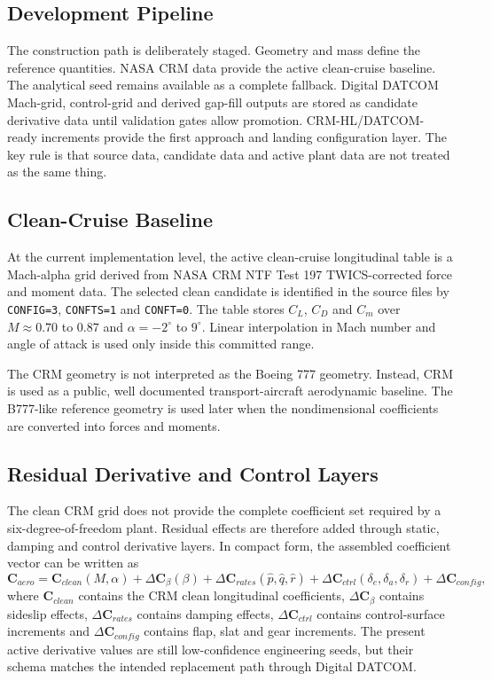 \subsection{Development Pipeline}

The construction path is deliberately staged. Geometry and mass define the
reference quantities. NASA CRM data provide the active clean-cruise baseline.
The analytical seed remains available as a complete fallback. Digital DATCOM
Mach-grid, control-grid and derived gap-fill outputs are stored as candidate
derivative data until validation gates allow promotion. CRM-HL/DATCOM-ready
increments provide the first approach and landing configuration layer. The key
rule is that source data, candidate data and active plant data are not treated
as the same thing.

\subsection{Clean-Cruise Baseline}

At the current implementation level, the active clean-cruise longitudinal table
is a Mach-alpha grid derived from NASA CRM NTF Test 197 TWICS-corrected force
and moment data. The selected clean candidate is identified in the source files
by \texttt{CONFIG=3}, \texttt{CONFTS=1} and \texttt{CONFT=0}. The table stores
$C_L$, $C_D$ and $C_m$ over $M \approx 0.70$ to $0.87$ and
$\alpha=-2^\circ$ to $9^\circ$. Linear interpolation in Mach number and angle
of attack is used only inside this committed range.

The CRM geometry is not interpreted as the Boeing 777 geometry. Instead, CRM is
used as a public, well documented transport-aircraft aerodynamic baseline. The
B777-like reference geometry is used later when the nondimensional
coefficients are converted into forces and moments.

\subsection{Residual Derivative and Control Layers}

The clean CRM grid does not provide the complete coefficient set required by a
six-degree-of-freedom plant. Residual effects are therefore added through
static, damping and control derivative layers. In compact form, the assembled
coefficient vector can be written as
\begin{equation}
    \bm{C}_{aero} =
    \bm{C}_{clean}(M,\alpha)
    + \Delta\bm{C}_{\beta}(\beta)
    + \Delta\bm{C}_{rates}(\hat{p},\hat{q},\hat{r})
    + \Delta\bm{C}_{ctrl}(\delta_e,\delta_a,\delta_r)
    + \Delta\bm{C}_{config},
\end{equation}
where $\bm{C}_{clean}$ contains the CRM clean longitudinal coefficients, $\Delta\bm{C}_{\beta}$ contains sideslip effects, $\Delta\bm{C}_{rates}$ contains damping effects, $\Delta\bm{C}_{ctrl}$ contains control-surface increments and $\Delta\bm{C}_{config}$ contains flap, slat and gear increments. The present active derivative values are still low-confidence engineering seeds, but their schema matches the intended replacement path through Digital DATCOM.

